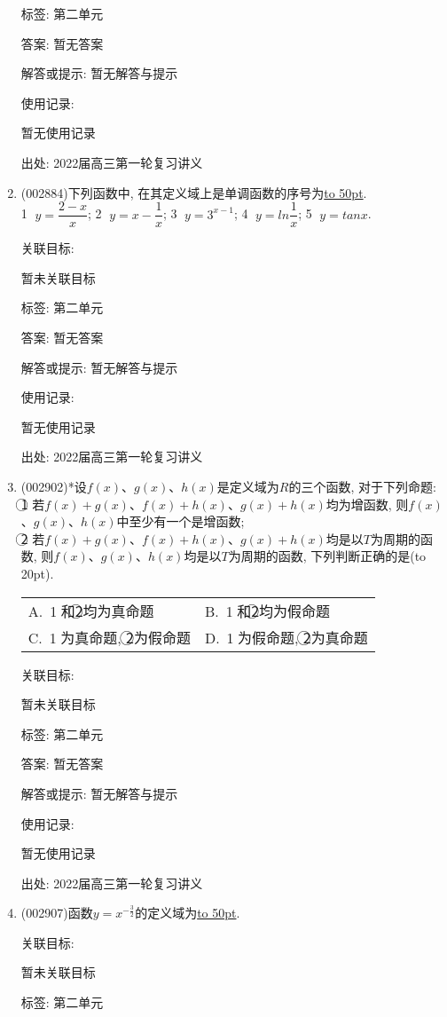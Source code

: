 \documentclass[10pt,a4paper]{article}
\newcommand{\blank}[1]{\underline{\hbox to #1pt{}}}
\newcommand{\bracket}[1]{(\hbox to #1pt{})}
\newcommand{\twoch}[4]{\par\begin{tabular}{p{.46\textwidth}p{.46\textwidth}}
A.~#1& B.~#2\\
C.~#3& D.~#4
\end{tabular}}
\begin{document}
\begin{enumerate}[1.]
标签: 第二单元

答案: 暂无答案

解答或提示: 暂无解答与提示

使用记录:

暂无使用记录


出处: 2022届高三第一轮复习讲义
\item { (002884)}下列函数中, 在其定义域上是单调函数的序号为\blank{50}.\\
\textcircled{1} $y=\dfrac{2-x}x$; \textcircled{2} $y=x-\dfrac 1x$; \textcircled{3} $y={3^{x-1}}$; \textcircled{4} $y=ln\dfrac 1x$; \textcircled{5} $y=tanx$.


关联目标:

暂未关联目标



标签: 第二单元

答案: 暂无答案

解答或提示: 暂无解答与提示

使用记录:

暂无使用记录


出处: 2022届高三第一轮复习讲义
\item { (002902)}*设$f(x)$、$g(x)$、$h(x)$是定义域为$R$的三个函数, 对于下列命题:\\
\textcircled{1} 若$f(x)+g(x)$、$f(x)+h(x)$、$g(x)+h(x)$均为增函数, 则$f(x)$、$g(x)$、$h(x)$中至少有一个是增函数;\\
\textcircled{2} 若$f(x)+g(x)$、$f(x)+h(x)$、$g(x)+h(x)$均是以$T$为周期的函数, 则$f(x)$、$g(x)$、$h(x)$均是以$T$为周期的函数, 下列判断正确的是\bracket{20}.
\twoch{\textcircled{1}和\textcircled{2}均为真命题}{\textcircled{1}和\textcircled{2}均为假命题}{\textcircled{1}为真命题, \textcircled{2}为假命题}{\textcircled{1}为假命题, \textcircled{2}为真命题}


关联目标:

暂未关联目标



标签: 第二单元

答案: 暂无答案

解答或提示: 暂无解答与提示

使用记录:

暂无使用记录


出处: 2022届高三第一轮复习讲义
\item { (002907)}函数$y=x^{-\frac 32}$的定义域为\blank{50}.


关联目标:

暂未关联目标



标签: 第二单元


\end{enumerate}
\end{document}
